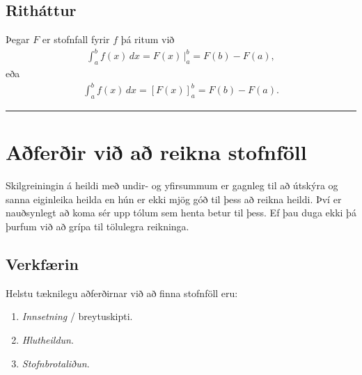 \documentclass[b5paper,10pt,icelandic]{sphinxmanual}
\begin{document}
\subsection{Ritháttur}
\label{\detokenize{kafli06:rithattur}}
Þegar \(F\) er stofnfall fyrir \(f\) þá ritum við
\begin{equation*}
\begin{split}\int_a^b f(x)\,dx=F(x)\,\bigg|_a^b= F(b)-F(a),\end{split}
\end{equation*}
eða
\begin{equation*}
\begin{split}\int_a^b f(x)\,dx=\left[F(x)\right]_a^b= F(b)-F(a).\end{split}
\end{equation*}

\bigskip\hrule\bigskip



\section{Aðferðir við að reikna stofnföll}
\label{\detokenize{kafli06:aferir-vi-a-reikna-stofnfoll}}
Skilgreiningin á heildi með undir- og yfirsummum er gagnleg til að útskýra
og sanna eiginleika heilda en hún er ekki mjög góð til þess að reikna
heildi. Því er nauðsynlegt að koma sér upp tólum sem henta betur til þess.
Ef þau duga ekki þá þurfum við að grípa til tölulegra reikninga.


\subsection{Verkfærin}
\label{\detokenize{kafli06:verkfaerin}}
Helstu tæknilegu aðferðirnar við að finna stofnföll eru:
\begin{enumerate}
\item {} 
\textit{Innsetning} / breytuskipti.

\item {} 
\textit{Hlutheildun}.

\item {} 
\textit{Stofnbrotaliðun}.

\end{enumerate}
\end{document}
